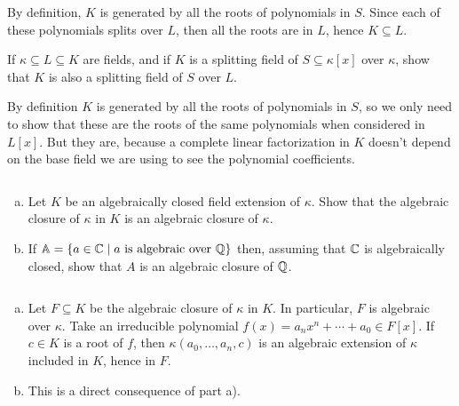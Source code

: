 \begin{solution}
    By definition, $K$ is generated by all the roots of polynomials in $S$. Since each of these polynomials splits over $L$, then all the roots are in $L$, hence $K\subseteq L$.
\end{solution}

\begin{probl}
    If\/ $\kappa \subseteq L \subseteq K$ are fields, and if\/ $K$ is a splitting field of\/ $S \subseteq \kappa[x]$ over $\kappa$, show that\/ $K$ is also a splitting field of\/ $S$ over\/ $L$.
\end{probl}

\begin{solution}
    By definition $K$ is generated by all the roots of polynomials in $S$, so we only need to show that these are the roots of the same polynomials when considered in $L[x]$. But they are, because a complete linear factorization in $K$ doesn't depend on the base field we are using to see the polynomial coefficients.
    
\end{solution}

\begin{probl}${}$
    \begin{enumerate}[a), font=\upshape]
        \item Let\/ $K$ be an algebraically closed field extension of\/ $\kappa$. Show that the algebraic closure of\/ $\kappa$ in\/ $K$ is an algebraic closure of\/ $\kappa$.
    
        \item If\/ $\mathbb A = \{a \in \mathbb{C} \mid a \text{\rm\ is algebraic over } \mathbb{Q}\}$ then, assuming that\/ $\mathbb{C}$ is algebraically closed, show that\/ $A$ is an algebraic closure of\/ $\mathbb{Q}$.
    \end{enumerate}
\end{probl}

\begin{solution}${}$
    \begin{enumerate}[a), font=\upshape]
        \item Let $F\subseteq K$ be the algebraic closure of $\kappa$ in $K$. In particular, $F$ is algebraic over $\kappa$. Take an irreducible polynomial $f(x)=a_nx^n+\cdots+a_0\in F[x]$. If $c\in K$ is a root of $f$, then $\kappa(a_0,\dots,a_n,c)$ is an algebraic extension of $\kappa$ included in $K$, hence in $F$.

        \item This is a direct consequence of part a).
    \end{enumerate}
\end{solution}

